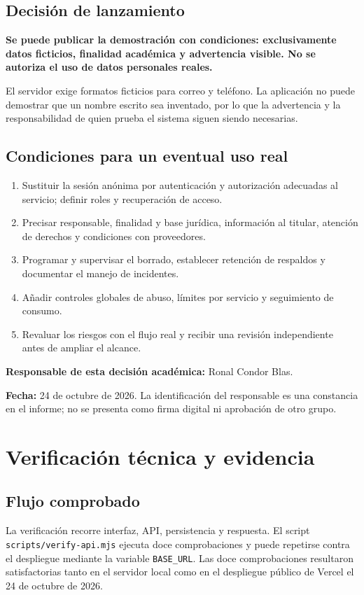 \documentclass[11pt,a4paper]{article}
\begin{document}
\subsection{Decisión de lanzamiento}
\textbf{Se puede publicar la demostración con condiciones: exclusivamente datos ficticios, finalidad académica y advertencia visible. No se autoriza el uso de datos personales reales.}

El servidor exige formatos ficticios para correo y teléfono. La aplicación no puede demostrar que un nombre escrito sea inventado, por lo que la advertencia y la responsabilidad de quien prueba el sistema siguen siendo necesarias.

\subsection{Condiciones para un eventual uso real}
\begin{enumerate}
\item Sustituir la sesión anónima por autenticación y autorización adecuadas al servicio; definir roles y recuperación de acceso.
\item Precisar responsable, finalidad y base jurídica, información al titular, atención de derechos y condiciones con proveedores.
\item Programar y supervisar el borrado, establecer retención de respaldos y documentar el manejo de incidentes.
\item Añadir controles globales de abuso, límites por servicio y seguimiento de consumo.
\item Revaluar los riesgos con el flujo real y recibir una revisión independiente antes de ampliar el alcance.
\end{enumerate}
\textbf{Responsable de esta decisión académica:} Ronal Condor Blas.

\textbf{Fecha:} 24 de octubre de 2026. La identificación del responsable es una constancia en el informe; no se presenta como firma digital ni aprobación de otro grupo.

\newpage
\section{Verificación técnica y evidencia}
\subsection{Flujo comprobado}
La verificación recorre interfaz, API, persistencia y respuesta. El script \texttt{scripts/verify-api.mjs} ejecuta doce comprobaciones y puede repetirse contra el despliegue mediante la variable \texttt{BASE\_URL}. Las doce comprobaciones resultaron satisfactorias tanto en el servidor local como en el despliegue público de Vercel el 24 de octubre de 2026.
\end{document}
